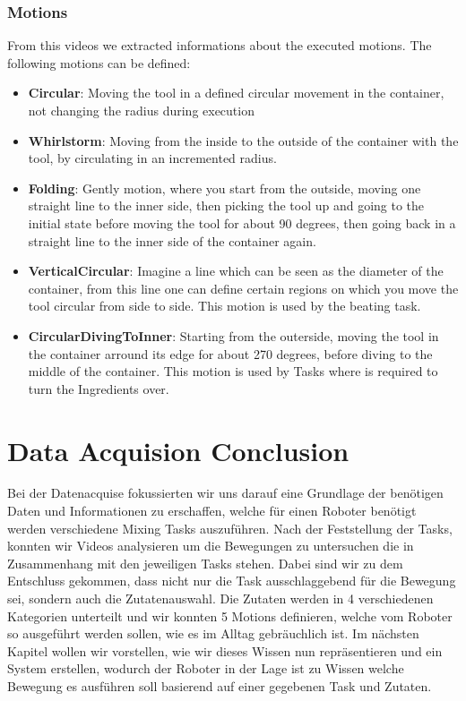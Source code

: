 \subsubsection*{Motions}
	From this videos we extracted informations about the executed motions. The following motions can be defined:
	\begin{itemize}
		\item \textbf{Circular}: Moving the tool in a defined circular movement in the container, not changing the radius during execution
		\item \textbf{Whirlstorm}: Moving from the inside to the outside of the container with the tool, by circulating in an incremented radius.
		\item \textbf{Folding}: Gently motion, where you start from the outside, moving one straight line to the inner side, then picking the tool up and going to the initial state before moving the tool for about 90 degrees, then going back in a straight line to the inner side of the container again.
		\item \textbf{VerticalCircular}: Imagine a line which can be seen as the diameter of the container, from this line one can define certain regions on which you move the tool circular from side to side. This motion is used by the beating task.
		\item \textbf{CircularDivingToInner}: Starting from the outerside, moving the tool in the container arround its edge for about 270 degrees, before diving to the middle of the container. This motion is used by Tasks where is required to turn the Ingredients over.
	\end{itemize}

\section*{Data Acquision Conclusion}

Bei der Datenacquise fokussierten wir uns darauf eine Grundlage der benötigen Daten und Informationen zu erschaffen, welche für einen Roboter benötigt werden verschiedene Mixing Tasks auszuführen.
Nach der Feststellung der Tasks, konnten wir Videos analysieren um die Bewegungen zu untersuchen die in Zusammenhang mit den jeweiligen Tasks stehen. Dabei sind wir zu dem Entschluss gekommen, dass nicht nur die Task ausschlaggebend für die Bewegung sei, sondern auch die Zutatenauswahl.
Die Zutaten werden in 4 verschiedenen Kategorien unterteilt und wir konnten 5 Motions definieren, welche vom Roboter so ausgeführt werden sollen, wie es im Alltag gebräuchlich ist.
Im nächsten Kapitel wollen wir vorstellen, wie wir dieses Wissen nun repräsentieren und ein System erstellen, wodurch der Roboter in der Lage ist zu Wissen welche Bewegung es ausführen soll basierend auf einer gegebenen Task und Zutaten.
\newpage

